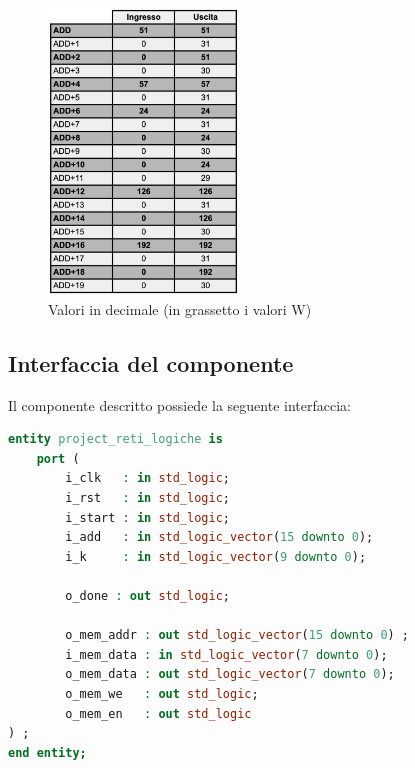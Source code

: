 \begin{figure}[H]
    \centering
    \includegraphics[width=0.45\textwidth]{figures/memory.png}
    \caption{Valori in decimale (in grassetto i valori W)}
    \label{fig:memory}
\end{figure}

\subsection{Interfaccia del componente}
Il componente descritto possiede la seguente interfaccia:

\begin{lstlisting}[basicstyle=\small, language=VHDL]
entity project_reti_logiche is
    port (
        i_clk   : in std_logic;
        i_rst   : in std_logic;
        i_start : in std_logic;
        i_add   : in std_logic_vector(15 downto 0);
        i_k     : in std_logic_vector(9 downto 0);

        o_done : out std_logic;

        o_mem_addr : out std_logic_vector(15 downto 0) ;
        i_mem_data : in std_logic_vector(7 downto 0);
        o_mem_data : out std_logic_vector(7 downto 0);
        o_mem_we   : out std_logic;
        o_mem_en   : out std_logic
) ;
end entity;
\end{lstlisting}

